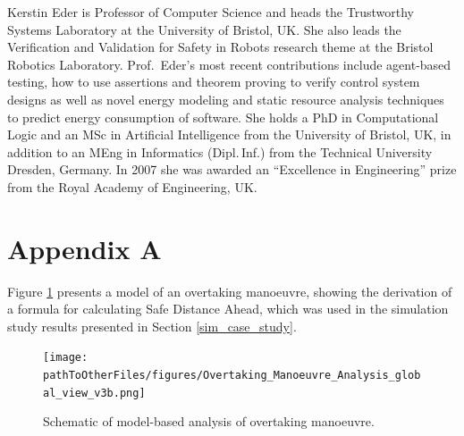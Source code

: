 \documentclass[letterpaper, 10 pt, journal, twoside]{IEEEtran}
\newcommand{\pathToSourceFiles}{../source}
\newcommand{\pathToOtherFiles}{../other}
\begin{document}
\begin{IEEEbiography}{{Kerstin Eder}} 
is Professor of Computer Science and heads the Trustworthy Systems Laboratory at the University of Bristol, UK. She also leads the Verification and Validation for Safety in Robots research theme at the  Bristol Robotics Laboratory. 
Prof.\ Eder's most recent contributions include agent-based testing, how to use assertions and theorem proving to verify control system designs as well as novel energy modeling and static resource analysis techniques to predict energy consumption of software. She holds a PhD in Computational Logic and an MSc in Artificial Intelligence from the University of Bristol, UK, in addition to an MEng in Informatics (Dipl.\,Inf.) from the Technical University Dresden, Germany. In 2007 she was awarded an ``Excellence in Engineering'' prize from the Royal Academy of Engineering, UK. 
\end{IEEEbiography}


\begingroup
\onecolumn 
\section*{Appendix A}\label{appendix_a}

Figure \ref{fig:overtaking_analysis_diag} presents a model of an overtaking manoeuvre, showing the derivation of a formula for calculating Safe Distance Ahead, which was used in the simulation study results presented in Section \ref{sim_case_study}.

\begin{figure}[h]
    \centering
    \texttt{[image: \\pathToOtherFiles/figures/Overtaking\_Manoeuvre\_Analysis\_global\_view\_v3b.png]}
    \caption{Schematic of model-based analysis of overtaking manoeuvre.}
    \label{fig:overtaking_analysis_diag}
\end{figure}

\endgroup
\end{document}

